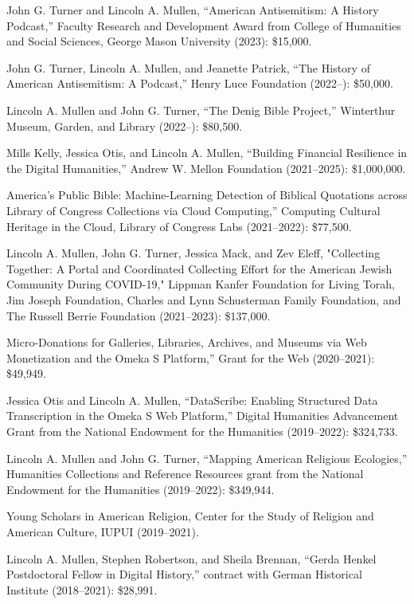 \documentclass[11pt]{article}
\begin{document}
John G. Turner and Lincoln A. Mullen, ``American Antisemitism: A History Podcast,'' Faculty Research and Development Award from College of Humanities and Social Sciences, George Mason University (2023): \$15,000.

John G. Turner, Lincoln A. Mullen, and Jeanette Patrick, ``The History of American Antisemitism: A Podcast,'' Henry Luce Foundation (2022--): \$50,000.

Lincoln A. Mullen and John G. Turner, ``The Denig Bible Project,'' Winterthur Museum, Garden, and Library (2022--): \$80,500.

Mills Kelly, Jessica Otis, and Lincoln A. Mullen, ``Building Financial Resilience in the Digital Humanities,'' Andrew W. Mellon Foundation (2021--2025): \$1,000,000.

\noindent{}America's Public Bible: Machine-Learning Detection of Biblical Quotations across Library of Congress Collections via Cloud Computing,'' Computing Cultural Heritage in the Cloud, Library of Congress Labs (2021--2022): \$77,500.

Lincoln A. Mullen, John G. Turner, Jessica Mack, and Zev Eleff, "Collecting Together: A Portal and Coordinated Collecting Effort for the American Jewish Community During COVID-19," Lippman Kanfer Foundation for Living Torah, Jim Joseph Foundation, Charles and Lynn Schusterman Family Foundation, and The Russell Berrie Foundation (2021--2023): \$137,000.

\noindent{}Micro-Donations for Galleries, Libraries, Archives, and Museums via Web Monetization and the Omeka S Platform,'' Grant for the Web (2020--2021): \$49,949.

Jessica Otis and Lincoln A. Mullen, ``DataScribe: Enabling Structured Data Transcription in the Omeka S Web Platform,'' Digital Humanities Advancement Grant from the National Endowment for the Humanities (2019--2022): \$324,733.

Lincoln A. Mullen and John G. Turner, ``Mapping American Religious Ecologies,'' Humanities Collections and Reference Resources grant from the National Endowment for the Humanities (2019--2022): \$349,944.

Young Scholars in American Religion, Center for the Study of Religion and American Culture, IUPUI (2019--2021).

Lincoln A. Mullen, Stephen Robertson, and Sheila Brennan, ``Gerda Henkel Postdoctoral Fellow in Digital History,'' contract with German Historical Institute (2018--2021): \$28,991.
\end{document}

